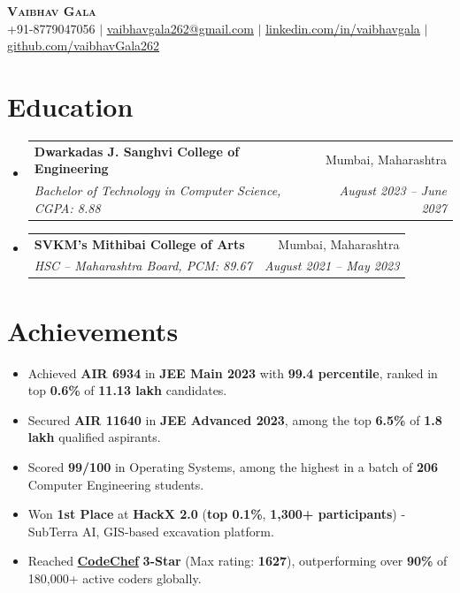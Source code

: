 \documentclass[letterpaper,11pt]{article}
\makeatletter
\newcommand{\resumeItem}[1]{
  \item\small{
    {#1 \vspace{-2pt}}
  }
}
\newcommand{\resumeSubheading}[4]{
  \vspace{-2pt}\item
    \begin{tabular*}{0.97\textwidth}[t]{l@{\extracolsep{\fill}}r}
      \textbf{#1} & #2 \\
      \textit{\small#3} & \textit{\small #4} \\
    \end{tabular*}\vspace{-7pt}
}
\newcommand{\resumeSubHeadingListStart}{\begin{itemize}[leftmargin=0.15in, label={}]}
\newcommand{\resumeSubHeadingListEnd}{\end{itemize}}
\newcommand{\resumeItemListStart}{\begin{itemize}}
\newcommand{\resumeItemListEnd}{\end{itemize}\vspace{-5pt}}
\makeatother
\begin{document}
\begin{center}
    \textbf{\Huge \scshape Vaibhav Gala} \\ \vspace{1pt}
    \small +91-8779047056 $|$
    \href{mailto:vaibhavgala262@gmail.com}{\underline{vaibhavgala262@gmail.com}} $|$
    \href{https://www.linkedin.com/in/vaibhav-gala-a39029280}{\underline{linkedin.com/in/vaibhavgala}} $|$
    \href{https://github.com/vaibhavGala262}{\underline{github.com/vaibhavGala262}}
\end{center}

\section{Education}
  \resumeSubHeadingListStart
    \resumeSubheading
      {Dwarkadas J. Sanghvi College of Engineering}{Mumbai, Maharashtra}
      {Bachelor of Technology in Computer Science, CGPA: 8.88 }{August 2023 -- June 2027}
      \resumeSubheading
      {SVKM's Mithibai College of Arts}{Mumbai, Maharashtra}
      {HSC -- Maharashtra Board, PCM: 89.67}{August 2021 -- May 2023}
   
  \resumeSubHeadingListEnd


  

  

\section{Achievements}
  \resumeItemListStart
    \resumeItem{Achieved \textbf{AIR 6934} in \textbf{JEE Main 2023} with \textbf{99.4 percentile}, ranked in top \textbf{0.6\%} of \textbf{11.13 lakh} candidates.}
    \resumeItem{Secured \textbf{AIR 11640} in \textbf{JEE Advanced 2023}, among the top \textbf{6.5\%} of \textbf{1.8 lakh} qualified aspirants.}
    \resumeItem{Scored \textbf{99/100} in Operating Systems, among the highest in a batch of \textbf{206} Computer Engineering students.}
    \resumeItem{Won \textbf{1st Place} at \textbf{HackX 2.0} (\textbf{top 0.1\%}, \textbf{1,300+ participants}) - SubTerra AI, GIS-based excavation platform.}
    \resumeItem{Reached \href{https://www.codechef.com/users/vaibhavgala262}{\textbf{CodeChef}} \textbf{3-Star} (Max rating: \textbf{1627}), outperforming over \textbf{90\%} of 180,000+ active coders globally.}
   
  \resumeItemListEnd

\end{document}
